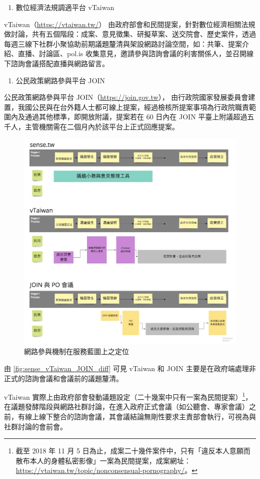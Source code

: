 \documentclass[12pt,a4paper]{article}
\begin{document}
\begin{enumerate}
\begin{enumerate}
\item 數位經濟法規調適平台 vTaiwan
\end{enumerate}
vTaiwan（\url{https://vtaiwan.tw/}）
由政府部會和民間提案，針對數位經濟相關法規做討論，共有五個階段：成案、意見徵集、研擬草案、送交院會、歷史案件，透過每週三線下社群小聚協助前期議題釐清與架設網路討論空間，如：共筆、提案介紹、直播、討論區、pol.is 收集意見，邀請參與諮詢會議的利害關係人，並召開線下諮詢會議搭配直播與網路留言。

\begin{enumerate}
\item 公民政策網路參與平台 JOIN
\end{enumerate}
公民政策網路參與平台 JOIN（\url{https://join.gov.tw}）， 由行政院國家發展委員會建置，我國公民與在台外籍人士都可線上提案，經過檢核所提案事項為行政院職責範圍內及通過其他標準，即開放附議，提案若在 60 日內在 JOIN 平臺上附議超過五千人，主管機關需在二個月內於該平台上正式回應提案。

\begin{figure}[htbp]
\centering
\includegraphics[width=.9\linewidth]{./images/sense_vTaiwan_JOIN_diff.jpg}
\caption{\label{fig:orgbe76d4e}
網路參與機制在服務藍圖上之定位}
\end{figure}

由 \ref{fig:sense_vTaiwan_JOIN_diff} 可見 vTaiwan 和 JOIN 主要是在政府端處理非正式的諮詢會議和會議前的議題釐清。

vTaiwan 實際上由政府部會發動議題設定（二十幾案中只有一案為民間提案）\footnote{截至 2018 年 11 月 5 日為止，成案二十幾件案件中，只有「違反本人意願而散布本人的身體私密影像」一案為民間提案，成案網址：\url{https://vtaiwan.tw/topic/nonconsensual-pornography/}。}，在議題發酵階段與網路社群討論，在進入政府正式會議（如公聽會、專家會議）之前，有線上線下整合的諮詢會議，其會議結論無剛性要求主責部會執行，可視為與社群討論的會前會。


\end{enumerate}
\end{document}
